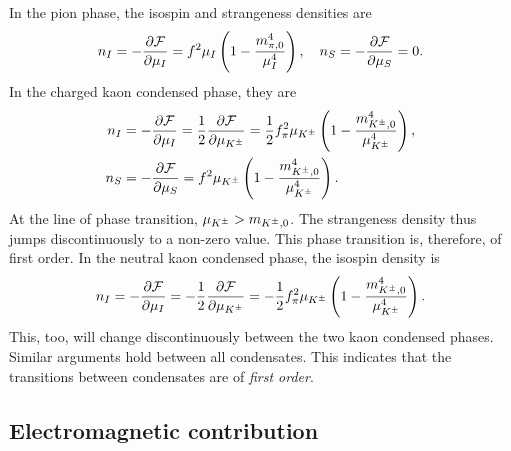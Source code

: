 In the pion phase, the isospin and strangeness densities are
%
\begin{equation}
    n_I = - \pdv{\mathcal{F}}{\mu_I} = f^2 \mu_I \left( 1 - \frac{m_{\pi,0}^4}{\mu_I^4} \right), \quad
    n_S = - \pdv{\mathcal{F}}{\mu_S} = 0.
\end{equation}
%
In the charged kaon condensed phase, they are
%
\begin{align}
    n_I &= - \pdv{\mathcal{F}}{\mu_I} 
    = \frac{1}{2} \pdv{\mathcal{F}}{\mu_{K^\pm}}
    = \frac{1}{2} f^2_\pi \mu_{K^\pm} \left( 1 - \frac{m_{{K^\pm},0}^4}{\mu_{K^\pm}^4} \right), \\
    n_S &= - \pdv{\mathcal{F}}{\mu_S} = f^2 \mu_{K^\pm}  \left( 1 - \frac{m_{{K^\pm},0}^4}{\mu_{K^\pm}^4} \right).
\end{align}
%
At the line of phase transition, $\mu_{K^\pm} > m_{{K^\pm},0}$.
The strangeness density thus jumps discontinuously to a non-zero value.
This phase transition is, therefore, of first order.
In the neutral kaon condensed phase, the isospin density is
%
\begin{equation}
    n_I = - \pdv{\mathcal{F}}{\mu_I} 
    = -\frac{1}{2} \pdv{\mathcal{F}}{\mu_{K^\pm}}
    = - \frac{1}{2}  f^2_\pi \mu_{K^\pm} \left( 1 - \frac{m_{{K^\pm},0}^4}{\mu_{K^\pm}^4} \right).
\end{equation}
%
This, too, will change discontinuously between the two kaon condensed phases.
Similar arguments hold between all condensates.
This indicates that the transitions between condensates are of \emph{first order}.




\subsection{Electromagnetic contribution}

